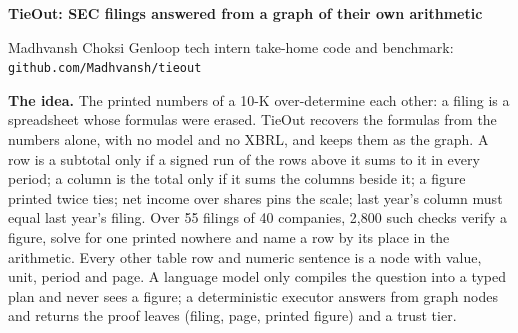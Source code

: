 \documentclass[10pt]{article}
\begin{document}
\small

{\Large\bfseries TieOut: SEC filings answered from a graph of their own arithmetic}\par\vspace{2pt}
{\normalsize Madhvansh Choksi \quad\textbar\quad Genloop tech intern take-home \quad\textbar\quad code and benchmark: \texttt{github.com/Madhvansh/tieout}}\par\vspace{3pt}

\textbf{The idea.} The printed numbers of a 10-K over-determine each other: a filing is a spreadsheet whose formulas were erased. TieOut recovers the formulas from the numbers alone, with no model and no XBRL, and keeps them as the graph. A row is a subtotal only if a signed run of the rows above it sums to it in every period; a column is the total only if it sums the columns beside it; a figure printed twice ties; net income over shares pins the scale; last year's column must equal last year's filing. Over 55 filings of 40 companies, 2,800 such checks verify a figure, solve for one printed nowhere and name a row by its place in the arithmetic. Every other table row and numeric sentence is a node with value, unit, period and page. A language model only compiles the question into a typed plan and never sees a figure; a deterministic executor answers from graph nodes and returns the proof leaves (filing, page, printed figure) and a trust tier.
\end{document}
